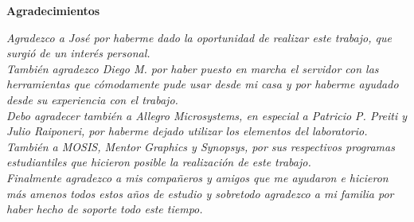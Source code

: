
\cleardoublepage 

\null{}

\begin{flushright}
	\bfseries
	Agradecimientos\\[2em]
	
	\normalfont
	
	\emph{Agradezco a José por haberme dado la oportunidad de realizar 
	este trabajo, que surgió de un interés personal.} \\[1em]
	
	\emph{También agradezco Diego M. por haber puesto en marcha 
	el servidor con las herramientas que cómodamente pude usar desde mi 
	casa y por haberme ayudado desde su experiencia con el trabajo.}\\[1em]
	
	\emph{Debo agradecer también a Allegro Microsystems, en especial a 
	Patricio P. Preiti y Julio Raiponeri, por haberme dejado utilizar 
	los elementos del laboratorio. También a MOSIS, Mentor Graphics y 
	Synopsys, por sus respectivos programas estudiantiles que hicieron 
	posible la realización de este trabajo.}\\[1em]
	
	\emph{Finalmente agradezco a mis compañeros y amigos que me ayudaron 
	e hicieron más amenos todos estos años de estudio y sobretodo 
	agradezco a mi familia por haber hecho de soporte todo este tiempo.}\\
	
\end{flushright}

\null
